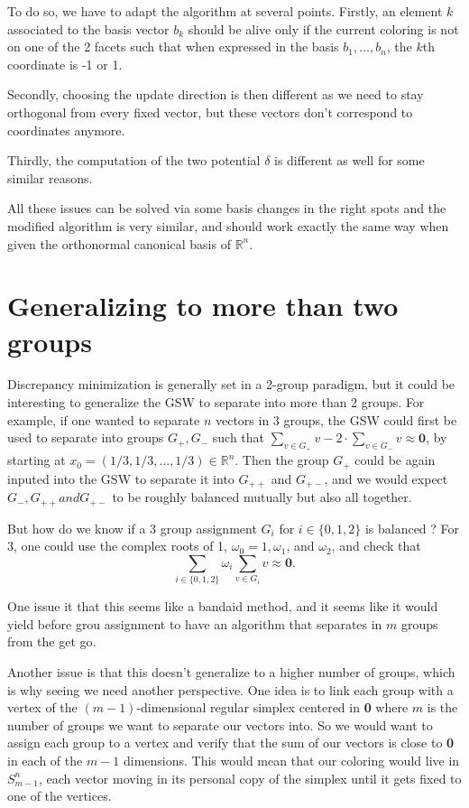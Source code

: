 \documentclass[12pt]{article}
\begin{document}
To do so, we have to adapt the algorithm at several points. Firstly, an element $k$ associated to the basis vector $b_k$ should be alive only if the current coloring is not on one of the 2 facets such that when expressed in the basis $b_1,\dots,b_n$, the $k$th coordinate is -1 or 1. 

Secondly, choosing the update direction is then different as we need to stay orthogonal from every fixed vector, but these vectors don't correspond to coordinates anymore.

Thirdly, the computation of the two potential $\delta$ is different as well for some similar reasons.

All these issues can be solved via some basis changes in the right spots and the modified algorithm is very similar, and should work exactly the same way when given the orthonormal canonical basis of $\mathbb{R}^n$.

\section{Generalizing to more than two groups}
Discrepancy minimization is generally set in a 2-group paradigm, but it could be interesting to generalize the GSW to separate into more than 2 groups. For example, if one wanted to separate $n$ vectors in 3 groups, the GSW could first be used to separate into groups $G_+,G_-$ such that $\sum_{v\in G_+}v-2\cdot\sum_{v\in G_-}v\approx \textbf{0}$, by starting at $x_0=(1/3,1/3,\dots,1/3)\in\mathbb{R}^n$. Then the group $G_+$ could be again inputed into the GSW to separate it into $G_{++}$ and $G_{+-}$, and we would expect $G_-,G_{++} and G_{+-}$ to be roughly balanced mutually but also all together.

But how do we know if a 3 group assignment $G_i$ for $i\in\{0,1,2\}$ is balanced ? For 3, one could use the complex roots of 1, $\omega_0=1 ,\omega_1$, and $\omega_2$, and check that $$\sum_{i\in\{0,1,2\}}\omega_i\sum_{v\in G_i}v\approx\textbf{0}.$$

One issue it that this seems like a bandaid method, and it seems like it would yield before grou assignment to have an algorithm that separates in $m$ groups from the get go.

Another issue is that this doesn't generalize to a higher number of groups, which is why seeing we need another perspective. One  idea is to link each group with a vertex of the $(m-1)$-dimensional regular simplex centered in \textbf{0} where $m$ is the number of groups we want to separate our vectors into. So we would want to assign each group to a vertex and verify that the sum of our vectors is close to \textbf{0} in each of the $m-1$ dimensions. This would mean that our coloring would live in $S_{m-1}^n$, each vector moving in its personal copy of the simplex until it gets fixed to one of the vertices.
\end{document}
